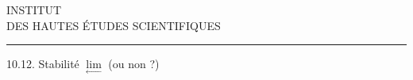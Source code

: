 \begin{center}
INSTITUT\\
DES HAUTES ÉTUDES SCIENTIFIQUES\\[-.3ex]
\rule{1.3cm}{.4pt}
\end{center}

10.12. Stabilité  $\underset{\longleftarrow}{\lim}$ (ou non ?)
